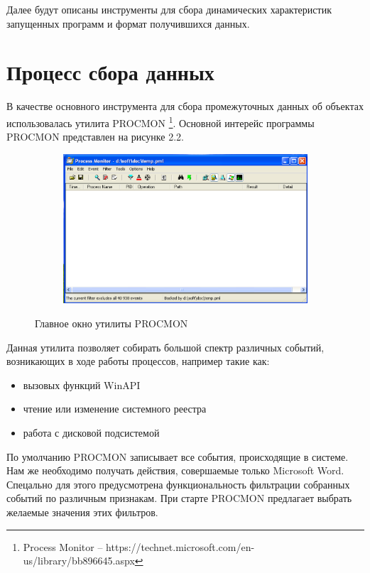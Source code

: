 Далее будут описаны инструменты для сбора динамических характеристик запущенных программ и формат получившихся данных.

\section{Процесс сбора данных}

В качестве основного инструмента для сбора промежуточных данных об объектах использовалась утилита PROCMON \footnote{Process Monitor -- https://technet.microsoft.com/en-us/library/bb896645.aspx}.
Основной интерейс программы PROCMON представлен на рисунке 2.2.

\newpage
\begin{figure}[ht]
	\centering
    \begin{subfigure}[b]{1\textwidth}
    \centering
        \includegraphics[scale=0.5]{procmon_main_window.png}        
    \end{subfigure}
 
    \caption{Главное окно утилиты PROCMON}
    \label{fig_parsetree}
\end{figure}

Данная утилита позволяет собирать большой спектр различных событий, возникающих в ходе работы процессов, например такие как:
\begin{itemize}
\item вызовых функций WinAPI
\item чтение или изменение системного реестра
\item работа с дисковой подсистемой
\end{itemize}

По умолчанию PROCMON записывает все события, происходящие в системе. 
Нам же необходимо получать действия, совершаемые только Microsoft Word.
Спецально для этого предусмотрена функциональность фильтрации собранных событий по различным признакам.
При старте PROCMON предлагает выбрать желаемые значения этих фильтров.

